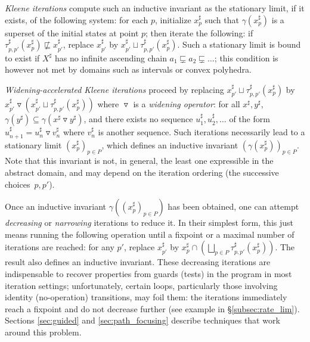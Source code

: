 \documentclass[preprint]{sigplanconf}
\newcommand{\abstr}[1]{#1^\sharp}
\newcommand{\widening}{\mathop{\triangledown}}
\begin{document}
\emph{Kleene iterations} compute such an inductive invariant as the stationary limit, if it exists, of the following system: for each $p$, initialize $\abstr{x}_p$ such that $\gamma(\abstr{x}_p)$ is a superset of the initial states at point $p$; then iterate the following:
if $\abstr{\tau}_{p,p'} (\abstr{x}_p) \nsqsubseteq \abstr{x}_{p'}$, replace $\abstr{x}_{p'}$ by $\abstr{x}_{p'} \sqcup \abstr{\tau}_{p,p'} (\abstr{x}_p)$.
Such a stationary limit is bound to exist if $\abstr{X}$ has no infinite ascending chain $a_1 \sqsubsetneq a_2 \sqsubsetneq \dots$; this condition is however not met by domains such as intervals or convex polyhedra.

\emph{Widening-accelerated Kleene iterations} proceed by replacing $\abstr{x}_{p'} \sqcup \abstr{\tau}_{p,p'} (\abstr{x}_p)$ by $\abstr{x}_{p'} \widening (\abstr{x}_{p'} \sqcup \abstr{\tau}_{p,p'} (\abstr{x}_p))$ where $\widening$ is a \emph{widening operator}: for all $\abstr{x},\abstr{y}$, $\gamma(\abstr{y}) \subseteq \gamma(\abstr{x} \widening \abstr{y})$, and there exists no sequence $\abstr{u}_1,\abstr{u}_2,\dots$ of the form $\abstr{u}_{n+1} = \abstr{u}_n \widening \abstr{v}_n$ where $\abstr{v}_n$ is another sequence.
Such iterations necessarily lead to a stationary limit $(\abstr{x}_p)_{p \in P}$, which defines an inductive invariant $(\gamma(\abstr{x}_p))_{p \in P}$. Note that this invariant is not, in general, the least one expressible in the abstract domain, and may depend on the iteration ordering (the successive choices~$p,p'$).

Once an inductive invariant $\gamma((\abstr{x}_p)_{p \in P})$ has been obtained, one can attempt \emph{decreasing} or \emph{narrowing} iterations to reduce it. In their simplest form, this just means running the following operation until a fixpoint or a maximal number of iterations are reached: for any $p'$, replace $\abstr{x}_{p'}$ by $\abstr{x}_p \cap \left(\bigsqcup_{p \in P} \abstr{\tau}_{p,p'} (\abstr{x}_p)\right)$. The result also defines an inductive invariant. These decreasing iterations are indispensable to recover properties from guards (tests) in the program in most iteration settings; unfortunately, certain loops, particularly those involving identity (no-operation) transitions, may foil them: the iterations immediately reach a fixpoint and do not decrease further (see example in \S\ref{subsec:rate_lim}). Sections \ref{sec:guided} and \ref{sec:path_focusing} describe techniques that work around this problem.
\end{document}
